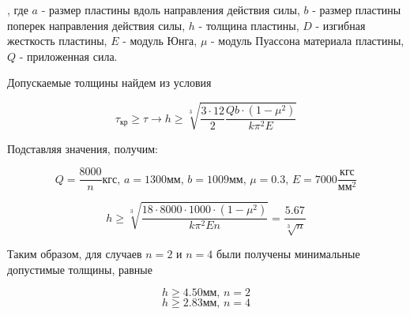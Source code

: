 , где $a$ - размер пластины вдоль направления действия силы, $b$ - размер пластины поперек направления действия силы, $h$ - толщина пластины, $D$ - изгибная жесткость пластины, $E$ - модуль Юнга, $\mu$ - модуль Пуассона материала пластины, $Q$ - приложенная сила.

Допускаемые толщины найдем из условия

\begin{equation}
\tau_\text{кр} \geq \tau \to h \geq \sqrt[3]{\frac{3\cdot12}{2}\frac{Qb\cdot(1-\mu^2)}{k\pi^2E}} 
\end{equation}

Подставляя значения, получим:

\begin{equation}
Q=\frac{8000}{n}\text{кгс},\,a=1300\text{мм},\,b=1009\text{мм},\,\mu=0.3,\,E=7000\frac{\text{кгс}}{\text{мм}^2}
\end{equation}

\begin{equation}
h \geq \sqrt[3]{\frac{18\cdot8000\cdot1000\cdot(1-\mu^2)}{k\pi^2En}} = \frac{5.67}{\sqrt[3]{n}} 
\end{equation}

Таким образом, для случаев $n = 2$ и $n = 4$  были получены минимальные допустимые толщины, 
равные

\begin{equation}
h\geq4.50\text{мм},\,n=2
\end{equation}
\begin{equation}
h\geq2.83\text{мм},\,n=4
\end{equation}
